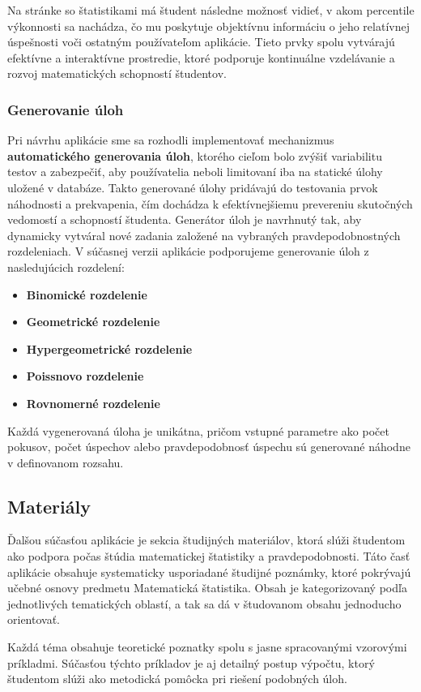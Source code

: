 Na stránke so štatistikami má študent následne možnosť vidieť, v akom percentile výkonnosti sa nachádza, čo mu poskytuje objektívnu informáciu o jeho relatívnej úspešnosti voči ostatným používateľom aplikácie. Tieto prvky spolu vytvárajú efektívne a interaktívne prostredie, ktoré podporuje kontinuálne vzdelávanie a rozvoj matematických schopností študentov.
\subsubsection*{Generovanie úloh}

Pri návrhu aplikácie sme sa rozhodli implementovať mechanizmus \textbf{automatického generovania úloh}, ktorého cieľom bolo zvýšiť variabilitu testov a zabezpečiť, aby používatelia neboli limitovaní iba na statické úlohy uložené v databáze. 
Takto generované úlohy pridávajú do testovania prvok náhodnosti a prekvapenia, čím dochádza k efektívnejšiemu prevereniu skutočných vedomostí a schopností študenta.
Generátor úloh je navrhnutý tak, aby dynamicky vytváral nové zadania založené na vybraných pravdepodobnostných rozdeleniach. V súčasnej verzii aplikácie podporujeme generovanie úloh z nasledujúcich rozdelení:

\begin{itemize} \item \textbf{Binomické rozdelenie} \item \textbf{Geometrické rozdelenie} \item \textbf{Hypergeometrické rozdelenie} \item \textbf{Poissnovo rozdelenie} \item \textbf{Rovnomerné rozdelenie} \end{itemize}

Každá vygenerovaná úloha je unikátna, pričom vstupné parametre ako počet pokusov, počet úspechov alebo pravdepodobnosť úspechu sú generované náhodne v definovanom rozsahu.
\subsection{Materiály}
Ďalšou súčasťou aplikácie je sekcia študijných materiálov, ktorá slúži študentom ako podpora počas štúdia matematickej štatistiky a pravdepodobnosti. 
Táto časť aplikácie obsahuje systematicky usporiadané študijné poznámky, ktoré pokrývajú učebné osnovy predmetu Matematická štatistika.
 Obsah je kategorizovaný podľa jednotlivých tematických oblastí, a tak sa dá v študovanom obsahu jednoducho orientovať.

Každá téma obsahuje teoretické poznatky spolu s jasne spracovanými vzorovými príkladmi. 
Súčasťou týchto príkladov je aj detailný postup výpočtu, ktorý študentom slúži ako metodická pomôcka pri riešení podobných úloh.

